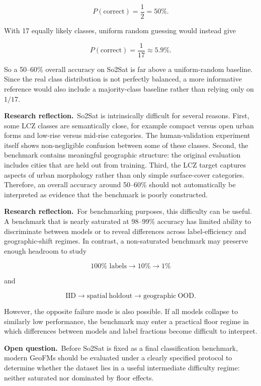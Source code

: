 \documentclass[11pt,a4paper]{article}
\newcommand{\reflection}{\textcolor{reflectionorange}{\textbf{Research reflection.}}}
\newcommand{\openquestion}{\textcolor{questionblue}{\textbf{Open question.}}}
\begin{document}
\[
P(\mathrm{correct})=\frac{1}{2}=50\%.
\]

With 17 equally likely classes, uniform random guessing would instead give

\[
P(\mathrm{correct})=\frac{1}{17}\approx5.9\%.
\]

So a 50--60\% overall accuracy on So2Sat is far above a uniform-random baseline. Since the
real class distribution is not perfectly balanced, a more informative reference would also
include a majority-class baseline rather than relying only on \(1/17\).

\reflection\ So2Sat is intrinsically difficult for several reasons. First, some LCZ classes
are semantically close, for example compact versus open urban forms and low-rise versus
mid-rise categories. The human-validation experiment itself shows non-negligible confusion
between some of these classes. Second, the benchmark contains meaningful geographic
structure: the original evaluation includes cities that are held out from training. Third,
the LCZ target captures aspects of urban morphology rather than only simple surface-cover
categories. Therefore, an overall accuracy around 50--60\% should not automatically be
interpreted as evidence that the benchmark is poorly constructed.

\reflection\ For benchmarking purposes, this difficulty can be useful. A benchmark that is
nearly saturated at 98--99\% accuracy has limited ability to discriminate between models or
to reveal differences across label-efficiency and geographic-shift regimes. In contrast, a
non-saturated benchmark may preserve enough headroom to study

\[
100\%\text{ labels}\rightarrow10\%\rightarrow1\%
\]

and

\[
\mathrm{IID}\rightarrow
\mathrm{spatial\ holdout}\rightarrow
\mathrm{geographic\ OOD}.
\]

However, the opposite failure mode is also possible. If all models collapse to similarly low
performance, the benchmark may enter a practical floor regime in which differences between
models and label fractions become difficult to interpret.

\openquestion\ Before So2Sat is fixed as a final classification benchmark, modern GeoFMs
should be evaluated under a clearly specified protocol to determine whether the dataset lies
in a useful intermediate difficulty regime: neither saturated nor dominated by floor effects.

\end{document}
